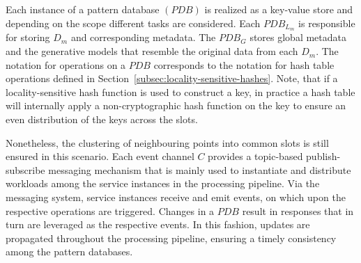 \documentclass[../../main.tex]{subfiles}
\begin{document}
    Each instance of a pattern database $(PDB)$ is realized as a key-value store and depending on the scope different tasks are considered. Each $PDB_{L_m}$ is responsible for storing $D_m$ and corresponding metadata. The $PDB_G$ stores global metadata and the generative models that resemble the original data from each $D_m$. The notation for operations on a $PDB$ corresponds to the notation for hash table operations defined in Section~\ref{subsec:locality-sensitive-hashes}. Note, that if a locality-sensitive hash function is used to construct a key, in practice a hash table will internally apply a non-cryptographic hash function on the key to ensure an even distribution of the keys across the slots.
    
    Nonetheless, the clustering of neighbouring points into common slots is still ensured in this scenario. Each event channel $C$ provides a topic-based publish-subscribe messaging mechanism that is mainly used to instantiate and distribute workloads among the service instances in the processing pipeline. Via the messaging system, service instances receive and emit events, on which upon the respective operations are triggered. Changes in a $PDB$ result in responses that in turn are leveraged as the respective events. In this fashion, updates are propagated throughout the processing pipeline, ensuring a timely consistency among the pattern databases.
\end{document}
